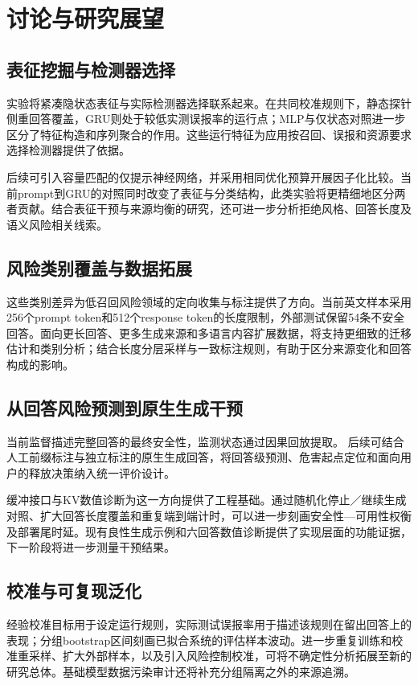 \section{讨论与研究展望}
\subsection{表征挖掘与检测器选择}
实验将紧凑隐状态表征与实际检测器选择联系起来。在共同校准规则下，静态探针侧重回答覆盖，GRU则处于较低实测误报率的运行点；MLP与仅状态对照进一步区分了特征构造和序列聚合的作用。这些运行特征为应用按召回、误报和资源要求选择检测器提供了依据。

后续可引入容量匹配的仅提示神经网络，并采用相同优化预算开展因子化比较。当前prompt到GRU的对照同时改变了表征与分类结构，此类实验将更精细地区分两者贡献。结合表征干预与来源均衡的研究，还可进一步分析拒绝风格、回答长度及语义风险相关线索。

\subsection{风险类别覆盖与数据拓展}

这些类别差异为低召回风险领域的定向收集与标注提供了方向。当前英文样本采用256个prompt token和512个response token的长度限制，外部测试保留54条不安全回答。面向更长回答、更多生成来源和多语言内容扩展数据，将支持更细致的迁移估计和类别分析；结合长度分层采样与一致标注规则，有助于区分来源变化和回答构成的影响。

\subsection{从回答风险预测到原生生成干预}
当前监督描述完整回答的最终安全性，监测状态通过因果回放提取。\TimingProfileZH{} 后续可结合人工前缀标注与独立标注的原生生成回答，将回答级预测、危害起点定位和面向用户的释放决策纳入统一评价设计。

缓冲接口与KV数值诊断为这一方向提供了工程基础。通过随机化停止／继续生成对照、扩大回答长度覆盖和重复端到端计时，可以进一步刻画安全性—可用性权衡及部署尾时延。现有良性生成示例和六回答数值诊断提供了实现层面的功能证据，下一阶段将进一步测量干预结果。

\subsection{校准与可复现泛化}
经验校准目标用于设定运行规则，实际测试误报率用于描述该规则在留出回答上的表现；分组bootstrap区间刻画已拟合系统的评估样本波动。进一步重复训练和校准重采样、扩大外部样本，以及引入风险控制校准，可将不确定性分析拓展至新的研究总体。基础模型数据污染审计还将补充分组隔离之外的来源追溯。

